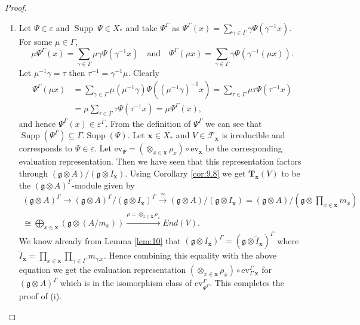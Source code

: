 \documentclass[10pt,a4paper]{amsart}
\DeclareMathOperator{\Supp}{Supp}
\newcommand{\g}{\mathfrak{g}}
\begin{document}
\begin{proof}
\begin{enumerate}[label=(\alph*)]
    \item Let $\Psi\in\varepsilon$ and $\Supp\ \Psi\in X_{*}$ and take $\Psi^{\Gamma}$ as 
        $\Psi^{\Gamma}(x)=\sum_{\gamma\in\Gamma}\gamma\Psi(\gamma^{-1}x).$
    For some $\mu\in\Gamma$,
\begin{equation*}
        \mu\Psi^{\Gamma}(x)=\sum_{\gamma\in\Gamma}\mu\gamma\Psi(\gamma^{-1}x)
   \quad \mbox{and} \quad
\Psi^{\Gamma}(\mu x)=\sum_{\gamma\in\Gamma}\gamma \Psi(\gamma^{-1}(\mu x)).
    \end{equation*}
    Let $\mu^{-1}\gamma=\tau$ then $\tau^{-1}=\gamma^{-1}\mu$. Clearly
    \begin{align*}
         \Psi^{\Gamma}(\mu x)&=\sum_{\gamma\in\Gamma}\mu(\mu^{-1}\gamma)\Psi((\mu^{-1}\gamma)^{-1} x)=\sum_{\tau\in\Gamma}\mu\tau\Psi(\tau^{-1}x)\\
        &=\mu\sum_{\tau\in\Gamma}\tau\Psi(\tau^{-1}x)=\mu\Psi^{\Gamma}(x),
    \end{align*}
    and hence $\Psi^{\Gamma}(x)\in\varepsilon^{\Gamma}$. From the definition of $\Psi^{\Gamma}$ we can see that  $\Supp(\Psi^{\Gamma})\subseteq\Gamma.\Supp(\Psi)$. Let $\textbf{x}\in X_{*}$ and $V\in\mathcal{F}_{\textbf{x}}$ is irreducible and corresponds to $\Psi\in\varepsilon$. Let $\mbox{ev}_{\Psi}=(\otimes_{x\in\textbf{x}}\rho_x)\circ\mbox{ev}_{\textbf{x}}$ be the corresponding evaluation representation. Then we have seen that this representation factors through $(\g\otimes A)/(\g\otimes I_{\textbf{x}})$. Using Corollary \ref{cor:9.8} we get $\textbf{T}_{\textbf{x}}(V)$ to be the $(\g\otimes A)^{\Gamma}$-module given by
    \begin{equation}
    \begin{split}
        (\g\otimes A)^{\Gamma}\rightarrow(\g\otimes A)^{\Gamma}/(\g\otimes I_{\textbf{x}})^{\Gamma}\xrightarrow{\cong}(\g\otimes A)/(\g\otimes I_{\textbf{x}})=(\g\otimes A)/(\g\otimes \prod_{x\in\textbf{x}}m_{x})\\\cong\bigoplus_{x\in\textbf{x}}(\g\otimes(A/m_{x}))\xrightarrow{\rho=\otimes_{x\in\textbf{x}}\rho_{x}}End(V).
    \end{split}    
    \end{equation}
    We know already from Lemma \ref{lem:10} that $(\g\otimes I_{\textbf{x}})^{\Gamma}=(\g\otimes \tilde I_{\textbf{x}})^{\Gamma}$ where $\tilde I_{\textbf{x}}=\prod_{x\in\textbf{x}}\prod_{\gamma\in\Gamma}m_{\gamma.x}$. Hence combining this equality with the above equation we get the evaluation representation $(\otimes_{x\in\textbf{x}}\rho_{x})\circ\mbox{ev}^{\Gamma}_{\Gamma.\textbf{x}}$ for $(\g\otimes A)^{\Gamma}$ which is in the isomorphism class of $\mbox{ev}^{\Gamma}_{\Psi^{\Gamma}}$. This completes the proof of (i).

\end{enumerate}
\end{proof}
\end{document}
